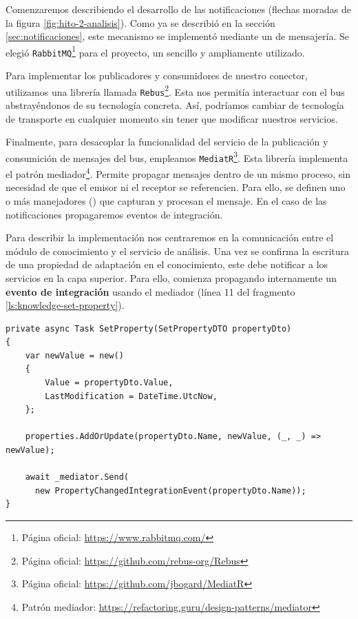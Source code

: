 Comenzaremos describiendo el desarrollo de las notificaciones (flechas moradas de la figura \ref{fig:hito-2-analisis}). Como ya se describió en la sección \ref{sec:notificaciones}, este mecanismo se implementó mediante un  de mensajería. Se elegió \texttt{RabbitMQ}\footnote{Página oficial: \url{https://www.rabbitmq.com/}} para el proyecto, un  sencillo y ampliamente utilizado. \cite{newmanBuildingMicroservicesDesigning2021}

Para implementar los publicadores y consumidores de nuestro conector, utilizamos una librería llamada \texttt{Rebus}\footnote{Página oficial: \url{https://github.com/rebus-org/Rebus}}. Esta nos permitía interactuar con el bus abstrayéndonos de su tecnología concreta. Así, podríamos cambiar de tecnología de transporte en cualquier momento sin tener que modificar nuestros servicios.

Finalmente, para desacoplar la funcionalidad del servicio de la publicación y consumición de mensajes del bus, empleamos \texttt{MediatR}\footnote{Página oficial: \url{https://github.com/jbogard/MediatR}}. Esta librería implementa el patrón mediador\footnote{Patrón mediador: \url{https://refactoring.guru/design-patterns/mediator}}. Permite propagar mensajes dentro de un mismo proceso, sin necesidad de que el emisor ni el receptor se referencien. Para ello, se definen uno o más manejadores () que capturan y procesan el mensaje. En el caso de las notificaciones propagaremos eventos de integración.

Para describir la implementación nos centraremos en la comunicación entre el módulo de conocimiento y el servicio de análisis. Una vez se confirma la escritura de una propiedad de adaptación en el conocimiento, este debe notificar a los servicios en la capa superior. Para ello, comienza propagando internamente un \textbf{evento de integración} usando el mediador (línea 11 del fragmento \ref{ls:knowledge-set-property}).

\begin{lstlisting}[caption={Implementación del método que asigna valor a una propiedad. Muestra un ejemplo de propagación interna de eventos de integración.\protect\footnotemark},captionpos=b, label=ls:knowledge-set-property]
private async Task SetProperty(SetPropertyDTO propertyDto)
{
    var newValue = new()
    {
        Value = propertyDto.Value,
        LastModification = DateTime.UtcNow,
    };

    properties.AddOrUpdate(propertyDto.Name, newValue, (_, _) => newValue);

    await _mediator.Send(
      new PropertyChangedIntegrationEvent(propertyDto.Name));
}

\end{lstlisting}


